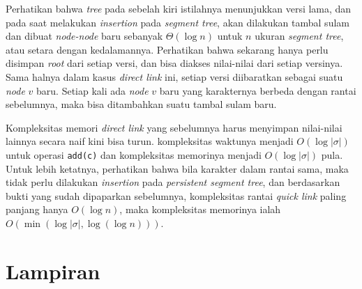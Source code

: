 \documentclass[11pt, a4paper, final]{article}
\begin{document}
Perhatikan bahwa \textit{tree} pada sebelah kiri istilahnya menunjukkan versi lama, dan pada saat melakukan \textit{insertion} pada \textit{segment tree}, akan dilakukan tambal sulam dan dibuat \textit{node-node} baru sebanyak $\Theta(\log n)$ untuk $n$ ukuran \textit{segment tree}, atau setara dengan kedalamannya. Perhatikan bahwa sekarang hanya perlu disimpan \textit{root} dari setiap versi, dan bisa diakses nilai-nilai dari setiap versinya. Sama halnya dalam kasus \textit{direct link} ini, setiap versi diibaratkan sebagai suatu \textit{node} $v$ baru. Setiap kali ada \textit{node} $v$ baru yang karakternya berbeda dengan rantai sebelumnya, maka bisa ditambahkan suatu tambal sulam baru.

Kompleksitas memori \textit{direct link} yang sebelumnya harus menyimpan nilai-nilai lainnya secara naif kini bisa turun. kompleksitas waktunya menjadi $O(\log |\sigma|)$ untuk operasi \texttt{add(c)} dan kompleksitas memorinya menjadi $O(\log |\sigma|)$ pula. Untuk lebih ketatnya, perhatikan bahwa bila karakter dalam rantai sama, maka tidak perlu dilakukan \textit{insertion} pada \textit{persistent segment tree}, dan berdasarkan bukti yang sudah dipaparkan sebelumnya, kompleksitas rantai \textit{quick link} paling panjang hanya $O(\log n)$, maka kompleksitas memorinya ialah $O(\min(\log |\sigma|, \log(\log n)))$.

\newpage
\nocite{*}




\newpage
\section*{Lampiran}
\newenvironment{code}{\captionsetup{type=listing}}{}
\end{document}
